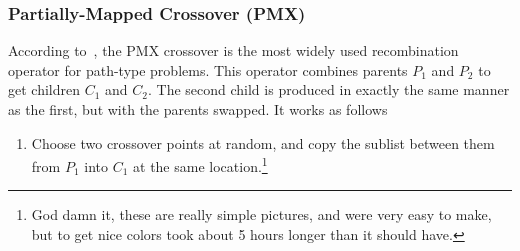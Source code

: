 \documentclass{article}
\begin{document}
\subsubsection{Partially-Mapped Crossover (PMX)}
According to~\cite{tsp_ea}, the PMX crossover is the most widely used recombination operator for
path-type problems. This operator combines parents $P_1$ and $P_2$ to get children $C_1$ and $C_2$.
The second child is produced in exactly the same manner as the first, but with the parents swapped.
It works as follows
\begin{enumerate}
    \item Choose two crossover points at random, and copy the sublist between them from $P_1$ into
          $C_1$ at the same location.\footnote{God damn it, these are really simple pictures, and
              were very easy to make, but to get nice colors took about 5 hours longer than it
              should have.}
          \begin{figure}[H]
              \centering
\end{figure}
\end{enumerate}
\end{document}
